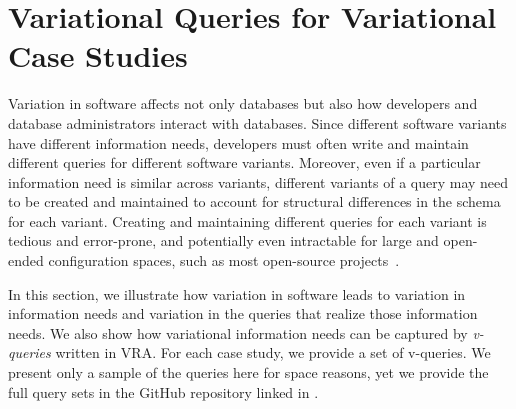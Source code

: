 \section{Variational Queries for Variational Case Studies}
\label{app:q}


Variation in software affects not only databases but also how developers and
database administrators interact with databases.
%
Since different software variants have different information needs, developers
must often write and maintain different queries for different software
variants. Moreover, even if a particular information need is similar across
variants, different variants of a query may need to be created and maintained
to account for structural differences in the schema for each variant.
%
Creating and maintaining different queries for each variant is tedious and
error-prone, and potentially even intractable for large and open-ended
configuration spaces, such as most open-source projects~\cite{ATW18poly}.


In this section, we illustrate how variation in software leads to variation in
information needs and variation in the queries that realize those information
needs. We also show how variational information needs can be captured by
\emph{v-queries} written in VRA.
%
For each case study, we provide a set of v-queries.
%
We present only a  sample of the queries here for space reasons,
yet we provide the full query sets in the GitHub repository linked in .
%


